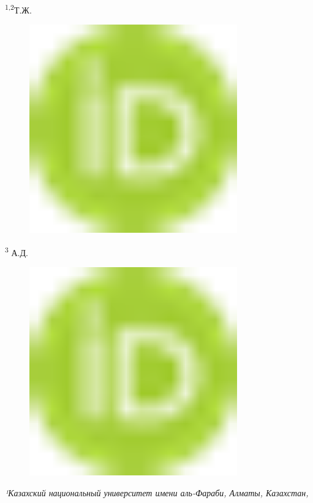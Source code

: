 \textsuperscript{1,2}Т.Ж.
\begin{figure}[H]
	\centering
	\includegraphics[width=0.8\textwidth]{media/ict2/image6}
	\caption*{}
\end{figure}

\textsuperscript{3} А.Д.
\begin{figure}[H]
	\centering
	\includegraphics[width=0.8\textwidth]{media/ict2/image6}
	\caption*{}
\end{figure}


\emph{¹Казахский национальный университет имени аль-Фараби, Алматы,
Казахстан,}

